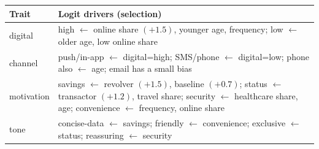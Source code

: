 \documentclass[11pt,a4paper]{article}
\begin{document}
\begin{center}
\small
\begin{tabularx}{\linewidth}{@{}p{2.1cm}X@{}}
\toprule
\textbf{Trait} & \textbf{Logit drivers (selection)}\\
\midrule
digital & high $\leftarrow$ online share $(+1.5)$, younger age, frequency; low $\leftarrow$ older age, low online share\\
channel & push/in-app $\leftarrow$ digital=high; SMS/phone $\leftarrow$ digital=low; phone also $\leftarrow$ age; email has a small bias\\
motivation & savings $\leftarrow$ revolver $(+1.5)$, baseline $(+0.7)$; status $\leftarrow$ transactor $(+1.2)$, travel share; security $\leftarrow$ healthcare share, age; convenience $\leftarrow$ frequency, online share\\
tone & concise-data $\leftarrow$ savings; friendly $\leftarrow$ convenience; exclusive $\leftarrow$ status; reassuring $\leftarrow$ security\\
\bottomrule
\end{tabularx}
\end{center}
\end{document}
